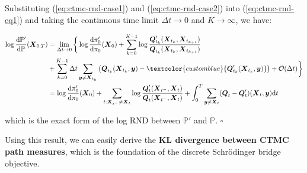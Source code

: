 \documentclass{article}
\newcommand{\boldtext}[1]{\textbf{\textcolor{MyGreen}{#1}}}
\newcommand{\bluetext}[1]{\textcolor{customblue}{#1}}
\begin{document}
Substituting (\ref{eq:ctmc-rnd-case1}) and (\ref{eq:ctmc-rnd-case2}) into (\ref{eq:ctmc-rnd-eq1}) and taking the continuous time limit $\Delta t\to 0$ and $K\to \infty$, we have:
\begin{small}
\begin{align}
    \log \frac{\mathrm{d}\mathbb{P}'}{\mathrm{d}\mathbb{P}}(\boldsymbol{X}_{0:T})&=\lim_{\Delta t\to 0}\bigg\{\log \frac{\mathrm{d}\pi_0'}{\mathrm{d}\pi_0}(\boldsymbol{X}_0)+\sum_{k=0}^{K-1}\log \frac{\boldsymbol{Q}'_{t_k}(\boldsymbol{X}_{t_k}, \boldsymbol{X}_{t_{k+1}})}{\boldsymbol{Q}_{t_k}(\boldsymbol{X}_{t_k}, \boldsymbol{X}_{t_{k+1}})}\nonumber\\
    &+\sum_{k=0}^{K-1}\Delta t\sum_{\boldsymbol{y}\neq \boldsymbol{X}_{t_k}}\left(\boldsymbol{Q}_{t_k}(\boldsymbol{X}_{t_k}, \boldsymbol{y})-\bluetext{\boldsymbol{Q}'_{t_k}(\boldsymbol{X}_{t_k}, \boldsymbol{y})}\right)+\mathcal{O}(\Delta t)\bigg\}\nonumber\\
    &=\log \frac{\mathrm{d}\pi_0'}{\mathrm{d}\pi_0}(\boldsymbol{X}_0)+\sum_{t:\boldsymbol{X}_{t^-}\neq \boldsymbol{X}_t}\log \frac{\boldsymbol{Q}_t'(\boldsymbol{X}_{t^-}, \boldsymbol{X}_t)}{\boldsymbol{Q}_t(\boldsymbol{X}_{t^-}, \boldsymbol{X}_t)}+\int_0^T\sum_{\boldsymbol{y}\neq\boldsymbol{X}_t}(\boldsymbol{Q}_t-\boldsymbol{Q}'_t)(\boldsymbol{X}_t,\boldsymbol{y})\mathrm{d}t
\end{align}
\end{small}
which is the exact form of the log RND between $\mathbb{P}'$ and $\mathbb{P}$. \hfill $\square$

Using this result, we can easily derive the \boldtext{KL divergence between CTMC path measures}, which is the foundation of the discrete Schrödinger bridge objective.
\end{document}
